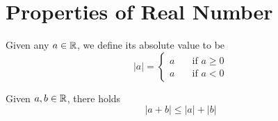 \chapter{Properties of Real Number}

\begin{definition}
Given any $a\in\mathbb R$, we define its absolute value to be
\[ |a| =
  \begin{cases}
    a       & \quad \text{if } a \geq 0 \\
    a  & \quad \text{if } a < 0
  \end{cases}
\]
\end{definition}

\begin{theorem}
Given $a, b\in\mathbb R$, there holds
$$|a+b|\leq |a| + |b|$$
\end{theorem}
